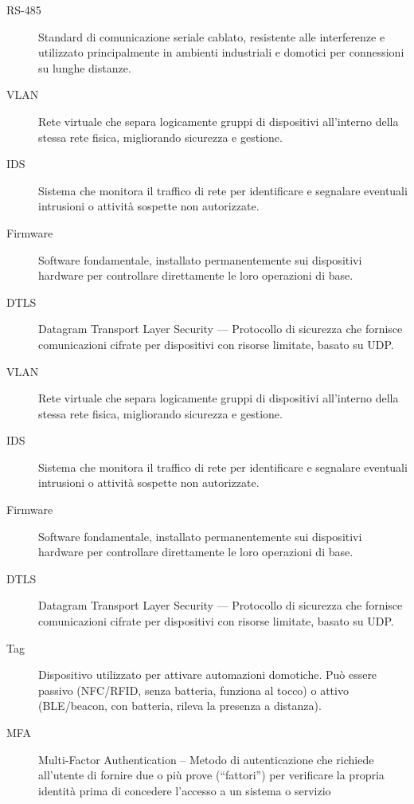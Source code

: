 \begin{description}
    \item[RS-485] Standard di comunicazione seriale cablato, resistente alle interferenze e utilizzato principalmente in ambienti industriali e domotici per connessioni su lunghe distanze.
    \item[VLAN] Rete virtuale che separa logicamente gruppi di dispositivi all'interno della stessa rete fisica, migliorando sicurezza e gestione.
    \item[IDS] Sistema che monitora il traffico di rete per identificare e segnalare eventuali intrusioni o attività sospette non autorizzate.
    \item[Firmware] Software fondamentale, installato permanentemente sui dispositivi hardware per controllare direttamente le loro operazioni di base.
    \item[DTLS] Datagram Transport Layer Security --- Protocollo di sicurezza che fornisce comunicazioni cifrate per dispositivi con risorse limitate, basato su UDP.
    \item[VLAN] Rete virtuale che separa logicamente gruppi di dispositivi all'interno della stessa rete fisica, migliorando sicurezza e gestione.
    \item[IDS] Sistema che monitora il traffico di rete per identificare e segnalare eventuali intrusioni o attività sospette non autorizzate.
    \item[Firmware] Software fondamentale, installato permanentemente sui dispositivi hardware per controllare direttamente le loro operazioni di base.
    \item[DTLS] Datagram Transport Layer Security --- Protocollo di sicurezza che fornisce comunicazioni cifrate per dispositivi con risorse limitate, basato su UDP.
    \item[Tag] Dispositivo utilizzato per attivare automazioni domotiche. Può essere passivo (NFC/RFID, senza batteria, funziona al tocco) o attivo (BLE/beacon, con batteria, rileva la presenza a distanza).
    \item[MFA] Multi-Factor Authentication – Metodo di autenticazione che richiede all’utente di fornire due o più prove (“fattori”) per verificare la propria identità prima di concedere l’accesso a un sistema o servizio
\end{description}